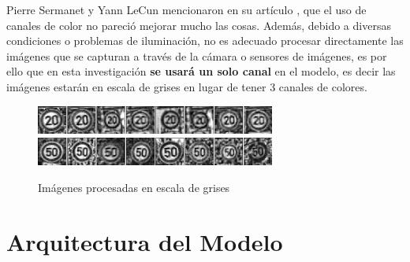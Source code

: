 	Pierre Sermanet y Yann LeCun mencionaron en su artículo \citep{LeCun}, que el uso de canales de color no pareció mejorar mucho las cosas. Además, debido a diversas condiciones o problemas de iluminación, no es adecuado procesar directamente las imágenes que se capturan a través de la cámara o sensores de imágenes, es por ello que en esta investigación {\bf se usará un solo canal} en el modelo, es decir las imágenes estarán en escala de grises en lugar de tener 3 canales de colores.
	
		\begin{figure}[H]
		\begin{center}
		\includegraphics[width=0.7\textwidth]{images/desarrollo/Normalization_Processing/proc_test1}
		\includegraphics[width=0.7\textwidth]{images/desarrollo/Normalization_Processing/proc_test2}
		\end{center}
		\begin{center}
		\caption{\small{Imágenes procesadas en escala de grises}}
		\vspace{-1em}
		{\small{\fontsize{10}{16.8}\selectfont {Fuente propia}}}
		\end{center}
		\vspace{-1.5em}
		\end{figure}

	

\section{Arquitectura del Modelo}
	

